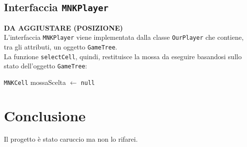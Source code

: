 \documentclass[11pt]{article}
\begin{document}
\subsection*{Interfaccia \texttt{MNKPlayer}}
\textbf{DA AGGIUSTARE (POSIZIONE)}\\
L'interfaccia \texttt{MNKPlayer} viene implementata dalla classe \texttt{OurPlayer} che contiene, tra gli attributi, un oggetto \texttt{GameTree}.\\
La funzione \texttt{selectCell}, quindi, restituisce la mossa da eseguire basandosi sullo stato dell'oggetto \texttt{GameTree}:
\begin{algorithm*}
\SetAlgoLined
\texttt{MNKCell} mossaScelta $\gets$ \texttt{null}\\
\vspace{0.2cm}
\end{algorithm*}

\section*{Conclusione}
Il progetto è stato caruccio ma non lo rifarei.
\end{document}
